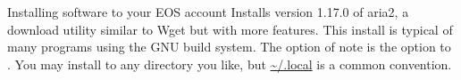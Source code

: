 \begin{block}{Installing software to your EOS account}
  Installs version 1.17.0 of aria2, a download utility similar to Wget but with more features. This install is typical of many programs using the GNU build system. The option of note is the  option to . You may install to any directory you like, but \url{\~/.local} is a common convention. \\
  \begin{indented}
    {\scriptsize \inputminted[tabsize=2,frame=single]{bash}{../common/install_aria2.bash}}
  \end{indented}
\end{block}
